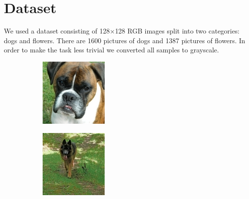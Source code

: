 \documentclass{report}
\begin{document}
\chapter{Dataset}
We used a dataset consisting of 128$\times$128 RGB images split into two categories: dogs and flowers. There are 1600 pictures of dogs and 1387 pictures of flowers.
In order to make the task less trivial we converted all samples to grayscale.

\begin{figure}[h!]
  \centering
  \begin{subfigure}[t]{0.19\textwidth}
    \centering
    \includegraphics[width=\textwidth]{dataset/dog_0.jpg}
    \label{fig:dataset-sub1}
  \end{subfigure}
  \hfill
  \begin{subfigure}[t]{0.19\textwidth}
    \centering
    \includegraphics[width=\textwidth]{dataset/dog_1.jpg}

\end{subfigure}
\end{figure}
\end{document}
